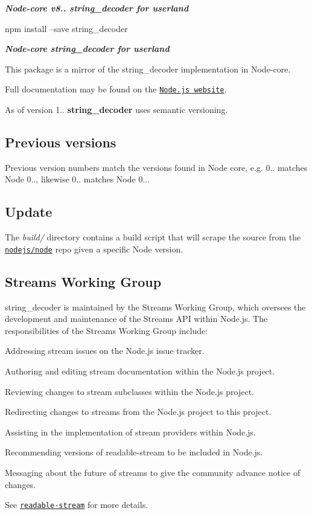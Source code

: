 {\itshape {\bfseries Node-\/core v8.. string\+\_\+decoder for userland}}

\href{https://nodei.co/npm/string_decoder/}{\tt } \href{https://nodei.co/npm/string_decoder/}{\tt }


\begin{DoxyCode}
npm install --save string\_decoder
\end{DoxyCode}


{\itshape {\bfseries Node-\/core string\+\_\+decoder for userland}}

This package is a mirror of the string\+\_\+decoder implementation in Node-\/core.

Full documentation may be found on the \href{https://nodejs.org/dist/v8.9.4/docs/api/}{\tt Node.\+js website}.

As of version 1.. {\bfseries string\+\_\+decoder} uses semantic versioning.

\subsection*{Previous versions}

Previous version numbers match the versions found in Node core, e.\+g. 0.. matches Node 0.., likewise 0.. matches Node 0...

\subsection*{Update}

The {\itshape build/} directory contains a build script that will scrape the source from the \href{https://github.com/nodejs/node}{\tt nodejs/node} repo given a specific Node version.

\subsection*{Streams Working Group}

{\ttfamily string\+\_\+decoder} is maintained by the Streams Working Group, which oversees the development and maintenance of the Streams A\+PI within Node.\+js. The responsibilities of the Streams Working Group include\+:


\begin{DoxyItemize}
\item Addressing stream issues on the Node.\+js issue tracker.
\item Authoring and editing stream documentation within the Node.\+js project.
\item Reviewing changes to stream subclasses within the Node.\+js project.
\item Redirecting changes to streams from the Node.\+js project to this project.
\item Assisting in the implementation of stream providers within Node.\+js.
\item Recommending versions of {\ttfamily readable-\/stream} to be included in Node.\+js.
\item Messaging about the future of streams to give the community advance notice of changes.
\end{DoxyItemize}

See \href{https://github.com/nodejs/readable-stream}{\tt readable-\/stream} for more details. 
